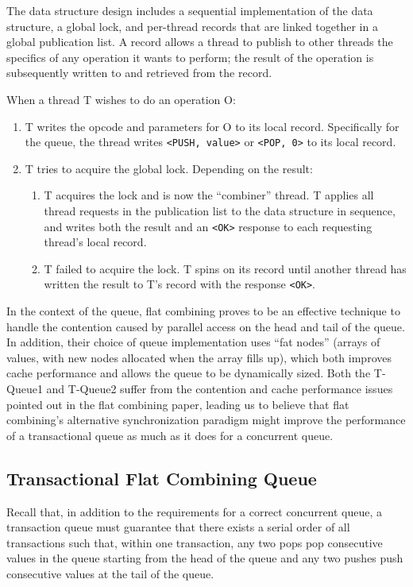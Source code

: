 The data structure design includes a sequential implementation of the data structure, a global lock, and per-thread records that are linked together in a global publication list. A record allows a thread to publish to other threads the specifics of any operation it wants to perform; the result of the operation is subsequently written to and retrieved from the record.

When a thread T wishes to do an operation O:
\begin{enumerate}
    \item T writes the opcode and parameters for O to its local record. Specifically for the queue, the thread writes \texttt{<PUSH, value>} or \texttt{<POP, 0>} to its local record.
   \item T tries to acquire the global lock. Depending on the result:
   \begin{enumerate}
        \item T acquires the lock and is now the “combiner” thread. T applies all thread requests in the publication list to the data structure in sequence, and writes both the result and an \texttt{<OK>} response to each requesting thread's local record.
        \item T failed to acquire the lock. T spins on its record until another thread has written the result to T's record with the response \texttt{<OK>}.
    \end{enumerate}
\end{enumerate}

In the context of the queue, flat combining proves to be an effective technique to handle the contention caused by parallel access on the head and tail of the queue. In addition, their choice of queue implementation uses ``fat nodes'' (arrays of values, with new nodes allocated when the array fills up), which both improves cache performance and allows the queue to be dynamically sized. Both the T-Queue1 and T-Queue2 suffer from the contention and cache performance issues pointed out in the flat combining paper, leading us to believe that flat combining's alternative synchronization paradigm might improve the performance of a transactional queue as much as it does for a concurrent queue.

\subsection{Transactional Flat Combining Queue} 
\label{fcqueuet}

Recall that, in addition to the requirements for a correct concurrent queue, a transaction queue must guarantee that there exists a serial order of all transactions such that, within one transaction, any two pops pop consecutive values in the queue starting from the head of the queue and any two pushes push consecutive values at the tail of the queue.

